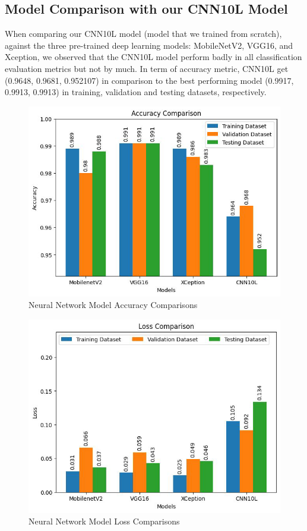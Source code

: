 \subsection{Model Comparison with our CNN10L Model}
When comparing our CNN10L model (model that we trained from scratch), against the three pre-trained deep learning models: MobileNetV2, VGG16, and Xception, we observed that the CNN10L model perform badly in all classification evaluation metrics but not by much. In term of accuracy metric, CNN10L get (0.9648, 0.9681, 0.952107) in comparison to the best performing model  (0.9917, 0.9913, 0.9913) in training, validation and testing datasets, respectively.
\par\vspace{1em}
\begin{figure}
    \centering
    \includegraphics[width=1\linewidth]{graphics//chapter6/nn model acc.png}
    \caption{Neural Network Model Accuracy Comparisons}
    \label{fig:nn-acc}
\end{figure}

\begin{figure}
    \centering
    \includegraphics[width=1\linewidth]{graphics//chapter6/nn loss comparison.png}
    \caption{Neural Network Model Loss Comparisons}
    \label{fig:nn-loss}
\end{figure}

